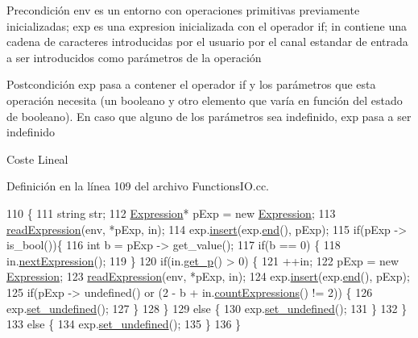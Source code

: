 \begin{DoxyPrecond}{Precondición}
\textquotesingle{}env\textquotesingle{} es un entorno con operaciones primitivas previamente inicializadas; \textquotesingle{}exp\textquotesingle{} es una expresion inicializada con el operador \textquotesingle{}if\textquotesingle{}; \textquotesingle{}in\textquotesingle{} contiene una cadena de caracteres introducidas por el usuario por el canal estandar de entrada a ser introducidos como parámetros de la operación 
\end{DoxyPrecond}
\begin{DoxyPostcond}{Postcondición}
\textquotesingle{}exp\textquotesingle{} pasa a contener el operador \textquotesingle{}if\textquotesingle{} y los parámetros que esta operación necesita (un booleano y otro elemento que varía en función del estado de booleano). En caso que alguno de los parámetros sea indefinido, \textquotesingle{}exp\textquotesingle{} pasa a ser indefinido 
\end{DoxyPostcond}
\begin{DoxyParagraph}{Coste}
Lineal 
\end{DoxyParagraph}


Definición en la línea 109 del archivo Functions\+I\+O.\+cc.


\begin{DoxyCode}
110 \{
111   \textcolor{keywordtype}{string} str;
112   \hyperlink{class_expression}{Expression}* pExp = \textcolor{keyword}{new} \hyperlink{class_expression}{Expression};
113   \hyperlink{_functions_i_o_8cc_a0c2a0ba0f4fe2dfe26ec14053ce4d408}{readExpression}(env, *pExp, in);
114   exp.\hyperlink{class_expression_a2f087974bb5cee7d0ea06838f5d68ba8}{insert}(exp.\hyperlink{class_expression_af5229aaf6bbb7200db55f220f315192e}{end}(), pExp);
115   \textcolor{keywordflow}{if}(pExp -> is\_bool())\{
116     \textcolor{keywordtype}{int} b = pExp -> get\_value();
117     \textcolor{keywordflow}{if}(b == 0) \{
118       in.\hyperlink{class_input_a1c8a389a2bccdcc8c6206c2fbdd6a9f8}{nextExpression}();
119     \}
120     \textcolor{keywordflow}{if}(in.\hyperlink{class_input_a61a5b6e5b3e5d7b3022cf93ee5320a1e}{get\_p}() > 0) \{
121       ++in;
122       pExp = \textcolor{keyword}{new} \hyperlink{class_expression}{Expression};
123       \hyperlink{_functions_i_o_8cc_a0c2a0ba0f4fe2dfe26ec14053ce4d408}{readExpression}(env, *pExp, in);
124       exp.\hyperlink{class_expression_a2f087974bb5cee7d0ea06838f5d68ba8}{insert}(exp.\hyperlink{class_expression_af5229aaf6bbb7200db55f220f315192e}{end}(), pExp);
125       \textcolor{keywordflow}{if}(pExp -> undefined() or  (2 - b + in.\hyperlink{class_input_ac9f1e2e25646ce602cf9ff83dcc563fe}{countExpressions}() != 2)) \{
126         exp.\hyperlink{class_expression_a1d3ddfe83d20f47930792807e8b22248}{set\_undefined}();
127       \}
128     \}
129     \textcolor{keywordflow}{else} \{
130       exp.\hyperlink{class_expression_a1d3ddfe83d20f47930792807e8b22248}{set\_undefined}();
131     \}
132   \}
133   \textcolor{keywordflow}{else} \{
134     exp.\hyperlink{class_expression_a1d3ddfe83d20f47930792807e8b22248}{set\_undefined}();
135   \}
136 \}
\end{DoxyCode}
